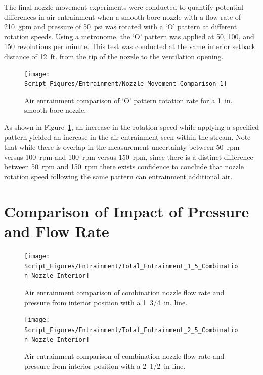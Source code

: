 \documentclass[12pt,oneside]{book}
\begin{document}
The final nozzle movement experiments were conducted to quantify potential differences in air entrainment when a smooth bore nozzle with a flow rate of 210~gpm and pressure of 50~psi was rotated with a `O' pattern at different rotation speeds. Using a metronome, the `O' pattern was applied at 50, 100, and 150 revolutions per minute. This test was conducted at the same interior setback distance of 12~ft. from the tip of the nozzle to the ventilation opening.

\begin{figure}[!ht]
\centering
\texttt{[image: Script\_Figures/Entrainment/Nozzle\_Movement\_Comparison\_1]}
\caption[Air Entrainment Comparison of Pattern Rotation Rate]{Air entrainment comparison of `O' pattern rotation rate for a 1~in. smooth bore nozzle.}
\label{fig:Nozzle_Movement_RotationSpeed_Comparison}
\end{figure}

As shown in Figure~\ref{fig:Nozzle_Movement_RotationSpeed_Comparison}, an increase in the rotation speed while applying a specified pattern yielded an increase in the air entrainment seen within the stream. Note that while there is overlap in the measurement uncertainty between 50~rpm versus 100~rpm and 100~rpm versus 150~rpm, since there is a distinct difference between 50~rpm and 150~rpm there exists confidence to conclude that nozzle rotation speed following the same pattern can entrainment additional air.

\section{Comparison of Impact of Pressure and Flow Rate}


\begin{figure}[!ht]
\centering
\texttt{[image: Script\_Figures/Entrainment/Total\_Entrainment\_1\_5\_Combination\_Nozzle\_Interior]}
\caption[Air Entrainment Comparison of Interior Combination Nozzle from 1~3/4~in. Line]{Air entrainment comparison of combination nozzle flow rate and pressure from interior position with a 1~3/4~in. line.}
\label{fig:SS_NF_FlowRate_Int}
\end{figure}


\begin{figure}[!ht]
\centering
\texttt{[image: Script\_Figures/Entrainment/Total\_Entrainment\_2\_5\_Combination\_Nozzle\_Interior]}
\caption[Air Entrainment Comparison of Interior Combination Nozzle from 2~1/2~in. Line]{Air entrainment comparison of combination nozzle flow rate and pressure from interior position with a 2~1/2~in line.}
\label{fig:SS_NF_FlowRate_Ext}
\end{figure}
\end{document}
